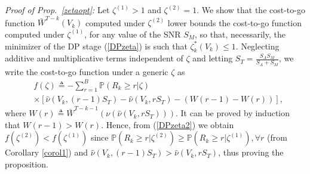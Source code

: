 \documentclass[10pt,twocolumn,twoside]{IEEEtran}
\theoremstyle{plain}
\begin{document}
\noindent\emph{Proof of Prop.~\ref{zetaopt}:}
Let $\zeta^{(1)}>1$ and $\zeta^{(2)}=1$.
We show that the cost-to-go function $\bar W^{T-k}(V_{k})$ computed under
$\zeta^{(2)}$ lower bounds the cost-to-go function computed under $\zeta^{(1)}$, for any value of the SNR $S_M$,
so that, necessarily, the minimizer of the DP stage (\ref{DPzeta}) is such that $\zeta_{k}^*(V_k)\leq 1$.
Neglecting additive and multiplicative terms independent of $\zeta$ and letting $S_T=\frac{S_AS_M}{S_A+S_M}$,
we write the cost-to-go function under a generic $\zeta$ as
\begin{align}
\label{DPzeta2}
&f(\zeta)
\triangleq
-\sum_{r=1}^B\mathbb P(R_k\geq r|\zeta)
\\&
\times\left[\hat \nu\left(V_{k},(r-1)S_T\right)-\hat \nu\left(V_{k},rS_T\right)-(W(r-1)-W(r))\right],
\nonumber
\end{align}
where $W(r){\triangleq}\bar W^{T-k-1}\left(\nu\left(\hat \nu\left(V_{k},rS_T\right)\right)\right)$.
It can be proved by induction that 
$W(r{-}1){>}W(r)$. Hence, from (\ref{DPzeta2})
we obtain $f(\zeta^{(2)}){<}f(\zeta^{(1)})$ since
 $\mathbb P(R_k\geq r|\zeta^{(2)}){\geq}\mathbb P(R_k\geq r|\zeta^{(1)}),\forall r$ (from Corollary \ref{corol1})
 and $\hat \nu\left(V_{k},(r-1)S_T\right){>}\hat \nu\left(V_{k},rS_T\right)$,
 thus proving the proposition.
\hfill\QED
\vspace{-3mm}
\end{document}
